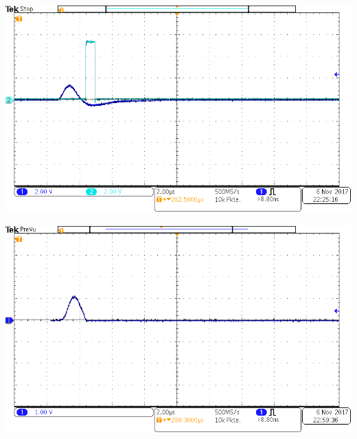 \begin{multicols}{2}
\begin{center}
        \label{fig:BipolarSignal}
    \end{center}
\endminipage
%
\vspace{10mm}
%
\minipage{\linewidth}
    \begin{center}
        \captionsetup{type=figure}
        \begin{adjustbox}{max width=\linewidth, keepaspectratio}
            \includegraphics[]{png/tek00006}
        \end{adjustbox}
        \label{fig:ExampleTSCA}
    \end{center}
\endminipage
%
\vspace{10mm}
%
\minipage{\linewidth}
    \begin{center}
        \captionsetup{type=figure}
        \begin{adjustbox}{max width=\linewidth, keepaspectratio}
            \includegraphics[]{png/tek00007}
        \end{adjustbox}
        \label{fig:TSCAplusLG}
    \end{center}
\endminipage
%
\end{multicols}
%
\newpage
%
